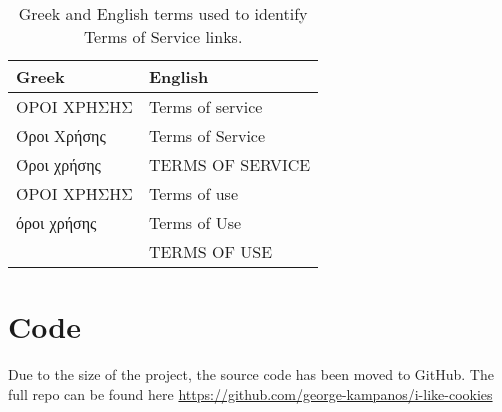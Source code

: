\documentclass[../main.tex]{subfiles}
\begin{document}
\begin{table}[ht]
    \centering
    \begin{tabular}{@{}ll@{}}
    \toprule
        Greek       & English          \\ \midrule
        ΟΡΟΙ ΧΡΗΣΗΣ & Terms of service \\
        Όροι Χρήσης & Terms of Service \\
        Όροι χρήσης & TERMS OF SERVICE \\
        ΌΡΟΙ ΧΡΉΣΗΣ & Terms of use     \\
        όροι χρήσης & Terms of Use     \\
                    & TERMS OF USE     \\ \bottomrule
    \end{tabular}
    \caption{Greek and English terms used to identify Terms of Service links.}
    \label{tab:tos_phrases}
\end{table}

\section{Code}

Due to the size of the project, the source code has been moved to GitHub. The full repo can be found here \url{https://github.com/george-kampanos/i-like-cookies}
\end{document}
